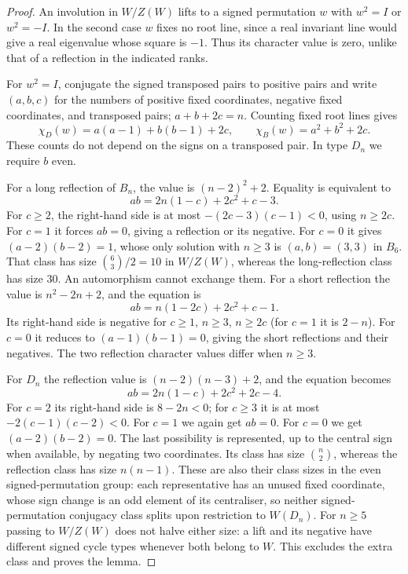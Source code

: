 \documentclass[11pt]{article}
\theoremstyle{definition}
\begin{document}
\begin{proof}
An involution in $W/Z(W)$ lifts to a signed permutation $w$ with $w^2=I$ or $w^2=-I$.
In the second case $w$ fixes no root line, since a real invariant line would give a real eigenvalue
whose square is $-1$. Thus its character value is zero, unlike that of a reflection in the indicated ranks.

For $w^2=I$, conjugate the signed transposed pairs to positive pairs and write $(a,b,c)$ for the numbers
of positive fixed coordinates, negative fixed coordinates, and transposed pairs; $a+b+2c=n$.
Counting fixed root lines gives
\[
 \chi_D(w)=a(a-1)+b(b-1)+2c,\qquad
 \chi_B(w)=a^2+b^2+2c.
\]
These counts do not depend on the signs on a transposed pair. In type $D_n$ we require $b$ even.

For a long reflection of $B_n$, the value is $(n-2)^2+2$. Equality is equivalent to
\[
 ab=2n(1-c)+2c^2+c-3.
\]
For $c\ge2$, the right-hand side is at most $-(2c-3)(c-1)<0$, using $n\ge2c$.
For $c=1$ it forces $ab=0$, giving a reflection or its negative. For $c=0$ it gives
$(a-2)(b-2)=1$, whose only solution with $n\ge3$ is $(a,b)=(3,3)$ in $B_6$.
That class has size $\binom63/2=10$ in $W/Z(W)$, whereas the long-reflection class has size $30$.
An automorphism cannot exchange them.
For a short reflection the value is $n^2-2n+2$, and the equation is
\[
 ab=n(1-2c)+2c^2+c-1.
\]
Its right-hand side is negative for $c\ge1$, $n\ge3$, $n\ge2c$ (for $c=1$ it is $2-n$).
For $c=0$ it reduces to $(a-1)(b-1)=0$, giving the short reflections and their negatives.
The two reflection character values differ when $n\ge3$.

For $D_n$ the reflection value is $(n-2)(n-3)+2$, and the equation becomes
\[
 ab=2n(1-c)+2c^2+2c-4.
\]
For $c=2$ its right-hand side is $8-2n<0$; for $c\ge3$ it is at most $-2(c-1)(c-2)<0$.
For $c=1$ we again get $ab=0$. For $c=0$ we get $(a-2)(b-2)=0$.
The last possibility is represented, up to the central sign when available, by negating two coordinates.
Its class has size $\binom n2$, whereas the reflection class has size $n(n-1)$.
These are also their class sizes in the even signed-permutation group: each representative has
an unused fixed coordinate, whose sign change is an odd element of its centraliser, so neither
signed-permutation conjugacy class splits upon restriction to $W(D_n)$.
For $n\ge5$ passing to $W/Z(W)$ does not halve either size: a lift and its negative have different
signed cycle types whenever both belong to $W$. This excludes the extra class and proves the lemma.
\end{proof}
\end{document}
